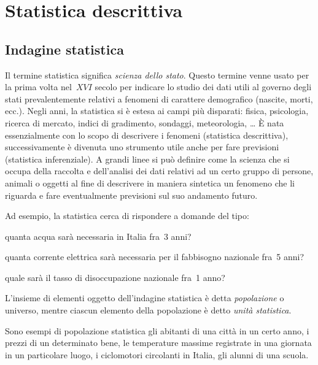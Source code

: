 
\chapter{Statistica descrittiva}

\section{Indagine statistica}
Il termine statistica significa \emph{scienza dello stato}. Questo termine venne usato per la prima volta nel~$XVI$ secolo
per indicare lo studio dei dati utili al governo degli stati prevalentemente relativi a fenomeni di carattere demografico (nascite, morti, ecc.).
Negli anni, la statistica si è estesa ai campi più disparati: fisica, psicologia, ricerca di mercato, indici di gradimento, sondaggi, meteorologia, \ldots
È nata essenzialmente con lo scopo di descrivere i fenomeni (statistica descrittiva), successivamente è divenuta uno strumento utile
anche per fare previsioni (statistica inferenziale). A grandi linee si può definire come la scienza che si occupa della raccolta e dell'analisi dei dati relativi
ad un certo gruppo di persone, animali o oggetti al fine di descrivere in maniera sintetica un fenomeno che li riguarda e fare eventualmente previsioni sul suo andamento futuro.

Ad esempio, la statistica cerca di rispondere a domande del tipo:
\begin{itemize*}
\item quanta acqua sarà necessaria in Italia fra~3 anni?
\item quanta corrente elettrica sarà necessaria per il fabbisogno nazionale fra~5 anni?
\item quale sarà il tasso di disoccupazione nazionale fra~1 anno?
\end{itemize*}

\begin{definizione}
L'insieme di elementi oggetto dell'indagine statistica è detta \emph{popolazione} o universo, mentre ciascun elemento della popolazione è detto \emph{unità statistica}.
\end{definizione}

Sono esempi di popolazione statistica gli abitanti di una città in un certo anno, i prezzi di un determinato bene, le temperature massime registrate
in una giornata in un particolare luogo, i ciclomotori circolanti in Italia, gli alunni di una scuola.

